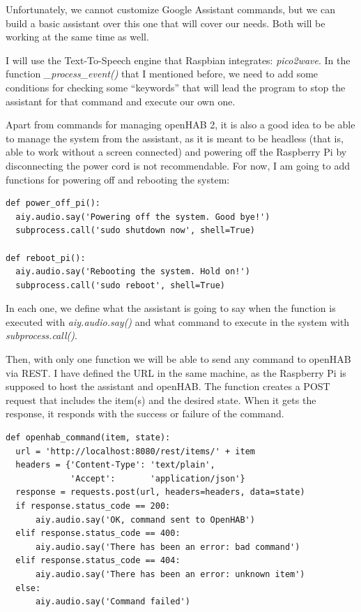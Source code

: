 Unfortunately, we cannot customize Google Assistant commands, but we can build a basic assistant over this one that will cover our
needs. Both will be working at the same time as well.

I will use the Text-To-Speech engine that Raspbian integrates: \textit{pico2wave}. In the function \textit{\_process\_event()} that
I mentioned before, we need to add some conditions for checking some “keywords” that will lead the program to stop the assistant
for that command and execute our own one.

Apart from commands for managing openHAB 2, it is also a good idea to be able to manage the system from the assistant, as it is
meant to be headless (that is, able to work without a screen connected) and powering off the Raspberry Pi by disconnecting the
power cord is not recommendable. For now, I am going to add functions for powering off and rebooting the system:

\begin{lstlisting}[style=PythonCode]
def power_off_pi():
  aiy.audio.say('Powering off the system. Good bye!')
  subprocess.call('sudo shutdown now', shell=True)

def reboot_pi():
  aiy.audio.say('Rebooting the system. Hold on!')
  subprocess.call('sudo reboot', shell=True)
\end{lstlisting}

In each one, we define what the assistant is going to say when the function is executed with \textit{aiy.audio.say()} and what
command to execute in the system with \textit{subprocess.call()}.

Then, with only one function we will be able to send any command to openHAB via REST. I have defined the URL in the same machine,
as the Raspberry Pi is supposed to host the assistant and openHAB. The function creates a POST request that includes the item(s)
and the desired state. When it gets the response, it responds with the success or failure of the command.

\begin{lstlisting}[style=PythonCode]
def openhab_command(item, state):
  url = 'http://localhost:8080/rest/items/' + item
  headers = {'Content-Type': 'text/plain',
             'Accept':       'application/json'}
  response = requests.post(url, headers=headers, data=state)
  if response.status_code == 200:
      aiy.audio.say('OK, command sent to OpenHAB')
  elif response.status_code == 400:
      aiy.audio.say('There has been an error: bad command')
  elif response.status_code == 404:
      aiy.audio.say('There has been an error: unknown item')
  else:
      aiy.audio.say('Command failed')
\end{lstlisting}

